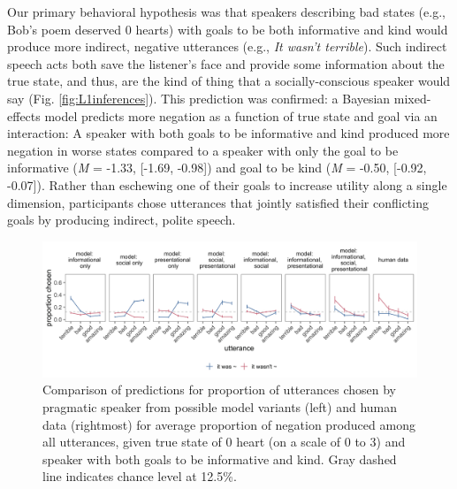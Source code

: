 \documentclass[9pt,twocolumn,twoside,lineno]{main_class_file}
\begin{document}
Our primary behavioral hypothesis was that speakers describing bad
states (e.g., Bob's poem deserved 0 hearts) with goals to be both
informative and kind would produce more indirect, negative utterances
(e.g., \emph{It wasn't terrible}). Such indirect speech acts both
save the listener's face and provide some information about the
true state, and thus, are the kind of thing that a socially-conscious speaker would say (Fig. \ref{fig:L1inferences}).
This prediction was confirmed: a Bayesian mixed-effects
model predicts more negation as a function of true state and goal via
an interaction: A speaker with both goals to be informative and
kind produced more negation in worse states compared to a speaker with
only the goal to be informative (\emph{M} = -1.33, {[}-1.69, -0.98{]})
and goal to be kind (\emph{M} = -0.50, {[}-0.92, -0.07{]}). Rather than
eschewing one of their goals to increase utility along a single
dimension, participants chose utterances that jointly satisfied their
conflicting goals by producing indirect, polite speech.

\begin{figure}[!h]
\includegraphics[width=\textwidth]{fig/comparison-1} \caption{Comparison of predictions for proportion of utterances chosen by pragmatic speaker from possible model variants (left) and human data (rightmost) for average proportion of negation produced among all utterances, given true state of 0 heart (on a scale of 0 to 3) and speaker with both goals to be informative and kind. Gray dashed line indicates chance level at 12.5\%.}\label{fig:comparison}
\end{figure}
\end{document}
